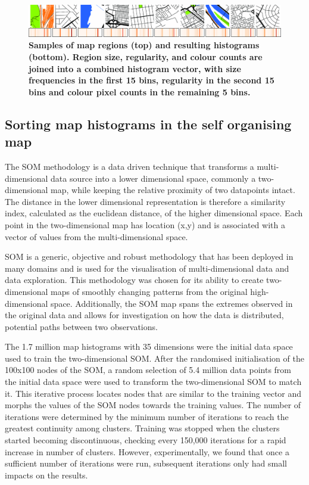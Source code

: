 \documentclass[9pt,twocolumn,twoside,lineno]{pnas-new}
\begin{document}
{\begin{figure}
\centering
 \includegraphics[trim={0 0 0 0},clip,scale=0.10]{BlockTypologies_Figures2-6.png}
\caption{\bf Samples of map regions (top) and resulting histograms (bottom). Region size, regularity, and colour counts are joined into a combined histogram vector, with size frequencies in the first 15 bins, regularity in the second 15 bins and colour pixel counts in the remaining 5 bins.}
 \label{fig:mapsandHist}
\end{figure} 

\subsection*{Sorting map histograms in the self organising map}\label{methodscluster}
The SOM methodology\cite{Kohonen1982} is a data driven technique that transforms a multi-dimensional data source into a lower dimensional space, commonly a two-dimensional map, while keeping the relative proximity of two datapoints intact. The distance in the lower dimensional representation is therefore a similarity index, calculated as the euclidean distance, of the higher dimensional space. Each point in the two-dimensional map has location (x,y) and is associated with a vector of values from the multi-dimensional space.

SOM is a generic, objective and robust methodology that has been deployed in many domains and is used for the visualisation of multi-dimensional data and data exploration\cite{Koleheimen2004}. This methodology was chosen for its ability to create two-dimensional maps of smoothly changing patterns from the original high-dimensional space. Additionally, the SOM map spans the extremes observed in the original data and allows for investigation on how the data is distributed, potential paths between two observations. 

The 1.7 million map histograms with 35 dimensions were the initial data space used to train the two-dimensional SOM. After the randomised initialisation of the 100x100 nodes of the SOM, a random selection of 5.4 million data points from the initial data space were used to transform the two-dimensional SOM to match it. This iterative process locates nodes that are similar to the training vector and morphs the values of the SOM nodes towards the training values. The number of iterations were determined by the minimum number of iterations to reach the greatest continuity among clusters. Training was stopped when the clusters started becoming discontinuous, checking every 150,000 iterations for a rapid increase in number of clusters. However, experimentally, we found that once a sufficient number of iterations were run, subsequent iterations only had small impacts on the results. 

}
\end{document}
